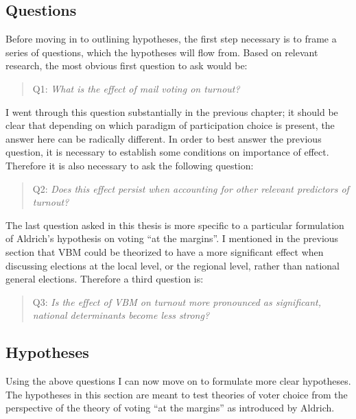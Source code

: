 \documentclass[12pt,twoside]{reedthesis}
\begin{document}
  \subsection{Questions}\label{questions}
  
  Before moving in to outlining hypotheses, the first step necessary is to
  frame a series of questions, which the hypotheses will flow from. Based
  on relevant research, the most obvious first question to ask would be:
  
  \begin{quotation}
  Q1: \textit{What is the effect of mail voting on turnout?}
  \end{quotation}
  
  I went through this question substantially in the previous chapter; it
  should be clear that depending on which paradigm of participation choice
  is present, the answer here can be radically different. In order to best
  answer the previous question, it is necessary to establish some
  conditions on importance of effect. Therefore it is also necessary to
  ask the following question:
  
  \begin{quotation}   
  Q2: \textit{Does this effect persist when accounting for other relevant predictors of turnout?}
  \end{quotation}
  
  The last question asked in this thesis is more specific to a particular
  formulation of Aldrich's hypothesis on voting ``at the margins''. I
  mentioned in the previous section that VBM could be theorized to have a
  more significant effect when discussing elections at the local level, or
  the regional level, rather than national general elections. Therefore a
  third question is:
  
  \begin{quotation}   
  Q3: \textit{Is  the  effect  of  VBM on turnout more  pronounced as significant, national determinants become less strong?}
  \end{quotation}
  
  \subsection{Hypotheses}\label{hypotheses-1}
  
  Using the above questions I can now move on to formulate more clear
  hypotheses. The hypotheses in this section are meant to test theories of
  voter choice from the perspective of the theory of voting ``at the
  margins'' as introduced by Aldrich.
  
\end{document}

